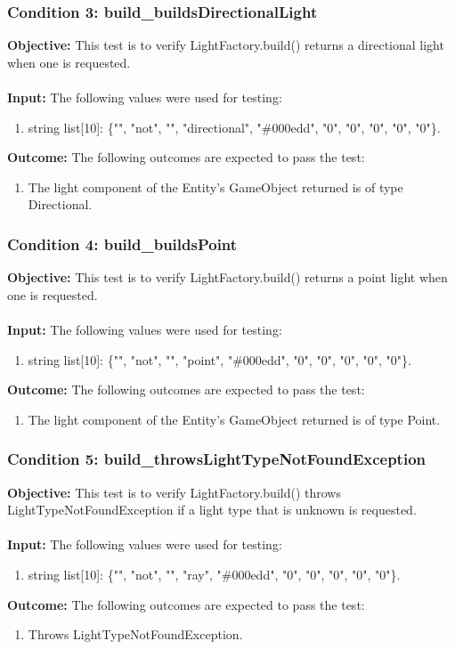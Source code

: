 \documentclass[a4paper,12pt]{article}
\begin{document}
		\subsubsection{Condition 3: build\_buildsDirectionalLight}
			\textbf{Objective:} This test is to verify  LightFactory.build() returns a directional light when one is requested.\\\\
			\textbf{Input:} The following values were used for testing:
				\begin{enumerate}
					\item string list[10]: \{"", "not", "", "directional", "\#000edd", "0", "0", "0", "0", "0"\}.
				\end{enumerate}
			\textbf{Outcome:} The following outcomes are expected to pass the test:
				\begin{enumerate}
					\item The light component of the Entity's GameObject returned is of type Directional.
				\end{enumerate}
		\subsubsection{Condition 4: build\_buildsPoint}
			\textbf{Objective:} This test is to verify  LightFactory.build() returns a point light when one is requested.\\\\
			\textbf{Input:} The following values were used for testing:
				\begin{enumerate}
					\item string list[10]: \{"", "not", "", "point", "\#000edd", "0", "0", "0", "0", "0"\}.
				\end{enumerate}
			\textbf{Outcome:} The following outcomes are expected to pass the test:
				\begin{enumerate}
					\item The light component of the Entity's GameObject returned is of type Point.
				\end{enumerate}
		\subsubsection{Condition 5: build\_throwsLightTypeNotFoundException}
			\textbf{Objective:} This test is to verify  LightFactory.build() throws LightTypeNotFoundException if a light type that is unknown is requested.\\\\
			\textbf{Input:} The following values were used for testing:
				\begin{enumerate}
					\item string list[10]: \{"", "not", "", "ray", "\#000edd", "0", "0", "0", "0", "0"\}.
				\end{enumerate}
			\textbf{Outcome:} The following outcomes are expected to pass the test:
				\begin{enumerate}
					\item Throws LightTypeNotFoundException.
				\end{enumerate}
\end{document}
